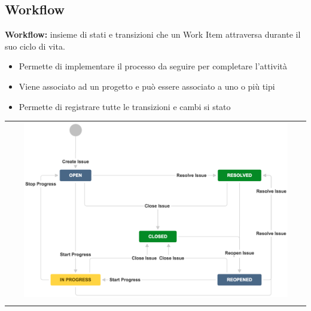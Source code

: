 \subsection{Workflow}
\begin{mdframed}
    \textbf{Workflow:} insieme di stati e transizioni che un Work Item attraversa durante il suo ciclo di vita.
\end{mdframed}
\begin{itemize}
    \item Permette di implementare il processo da seguire per completare l’attività
    \item Viene associato ad un progetto e può essere associato a uno o più tipi
    \item Permette di registrare tutte le transizioni e cambi si stato
\end{itemize}
\begin{center}
    \begin{tabular}{c}
        \\ \includegraphics[width=0.9\textwidth]{images/ITS1.png} \\ \\
    \end{tabular}
\end{center}

